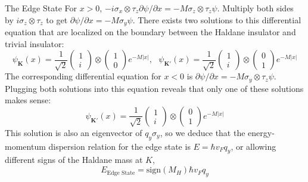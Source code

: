 \documentclass[a4paper,12pt]{article}
\renewcommand{\vec}[1]{\boldsymbol{\mathbf{#1}}}
\begin{document}
\begin{section}{The Edge State}
For $x>0$, $-i \sigma_x \otimes \tau_z \partial \psi / \partial x = -M \sigma_z \otimes \tau_z \psi$.  Multiply both sides by $i \sigma_z \otimes \tau_z$ to get $\partial \psi / \partial x = - M \sigma_y \psi$.  There exists two solutions to this differential equation that are localized on the boundary between the Haldane insulator and trivial insulator:
\begin{equation}
\psi_{\vec{K}}(x) = \frac{1}{\sqrt{2}} \left(
\begin{array}{c}
1 \\
i
\end{array}
\right) \otimes
\left(
\begin{array}{c}
1 \\
0
\end{array}
\right)
e^{- M |x|}, \text{ }
\psi_{\vec{K'}}(x) = \frac{1}{\sqrt{2}} \left(
\begin{array}{c}
1 \\
i
\end{array}
\right) \otimes
\left(
\begin{array}{c}
0 \\
1
\end{array}
\right)
e^{- M |x|}
\end{equation}
The corresponding differential equation for $x<0$ is $\partial \psi / \partial x = -M \sigma_y \otimes \tau_z \psi$.  Plugging both solutions into this equation reveals that only one of these solutions makes sense:
\begin{equation}
\psi_{\vec{K'}}(x) = \frac{1}{\sqrt{2}} \left(
\begin{array}{c}
1 \\
i
\end{array}
\right) \otimes
\left(
\begin{array}{c}
0 \\
1
\end{array}
\right)
e^{- M |x|}
\end{equation}
This solution is also an eigenvector of $q_y \sigma_y$, so we deduce that the energy-momentum dispersion relation for the edge state is $E=\hbar v_F q_y$, or allowing different signs of the Haldane mass at $K$,
\begin{equation}
E_{\text{Edge State}}=\text{sign}(M_H)\hbar v_F q_y
\label{eq:dispersion}
\end{equation}

\end{section}
\end{document}
